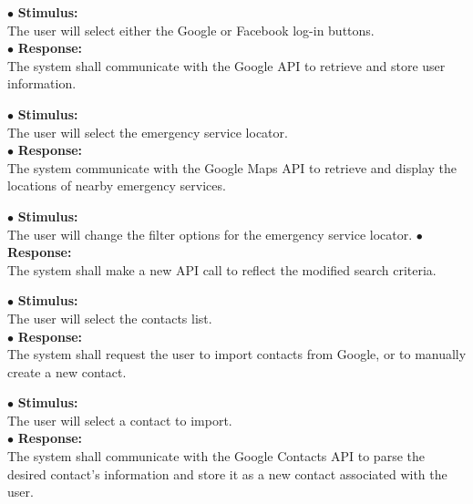 \documentclass{scrreprt}
\begin{document}
\vspace{5mm}
	\hspace{-4.75mm} $\bullet$ \textbf{Stimulus:} \\ \hspace{5mm} The user will select either the Google or Facebook log-in buttons.\\
	$\bullet$ \textbf{Response:} \\ \hspace{5mm} The system shall communicate with the Google API to retrieve and store user information.

\vspace{5mm}
	\hspace{-4.75mm} $\bullet$ \textbf{Stimulus:} \\ \hspace{5mm} The user will select the emergency service locator.\\
	$\bullet$ \textbf{Response:} \\ \hspace{5mm} The system communicate with the Google Maps API to retrieve and display the locations of nearby emergency services.

\vspace{5mm}
	\hspace{-4.75mm} $\bullet$ \textbf{Stimulus:} \\ \hspace{5mm} The user will change the filter options for the emergency service locator.
	$\bullet$ \textbf{Response:} \\ \hspace{5mm} The system shall make a new API call to reflect the modified search criteria.
\newpage

\vspace{5mm}
	\hspace{-4.75mm} $\bullet$ \textbf{Stimulus:} \\ \hspace{5mm} The user will select the contacts list.\\
	$\bullet$ \textbf{Response:} \\ \hspace{5mm} The system shall request the user to import contacts from Google, or to manually create a new contact.

\vspace{5mm}
	\hspace{-4.75mm} $\bullet$ \textbf{Stimulus:} \\ \hspace{5mm} The user will select a contact to import.\\
	$\bullet$ \textbf{Response:} \\ \hspace{5mm} The system shall communicate with the Google Contacts API to parse the desired contact's information and store it as a new contact associated with the user.
\end{document}

